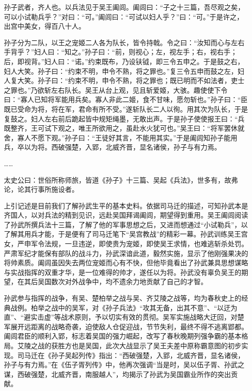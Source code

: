 \documentclass[12pt,UTF8]{ctexbook}
\begin{document}
孙子武者，齐人也。以兵法见于吴王阖闾。阖闾曰：“子之十三篇，吾尽观之矣，可以小试勒兵乎？”对曰：“可。”阖闾曰：“可试以妇人乎？”曰：“可。”于是许之，出宫中美女，得百八十人。

孙子分为二队，以王之宠姬二人各为队长，皆令持戟。令之曰：“汝知而心与左右手背乎？”妇人曰：“知之。”孙子曰：“前，则视心；左，视左手；右，视右手；后，即视背。”妇人曰：“诺。”约束既布，乃设𫓧钺，即三令五申之。于是鼓之右，妇人大笑。孙子曰：“约束不明，申令不熟，将之罪也。”复三令五申而鼓之左，妇人复大笑。孙子曰：“约束不明，申令不熟，将之罪也；既已明而不如法者，吏士之罪也。”乃欲斩左右队长。吴王从台上观，见且斩爱姬，大骇。趣使使下令曰：“寡人已知将军能用兵矣。寡人非此二姬，食不甘味，愿勿斩也。”孙子曰：“臣既已受命为将，将在军，君命有所不受。”遂斩队长二人以徇。用其次为队长，于是复鼓之。妇人左右前后跪起皆中规矩绳墨，无敢出声。于是孙子使使报王曰：“兵既整齐，王可试下观之，唯王所欲用之，虽赴水火犹可也。”吴王曰：“将军罢休就舍，寡人不愿下观。”孙子曰：“王徒好其言，不能用其实。”于是阖闾知孙子能用兵，卒以为将。西破强楚，入郢，北威齐晋，显名诸侯，孙子与有力焉。

……

太史公曰：世俗所称师旅，皆道《孙子》十三篇、吴起《兵法》，世多有，故弗论，论其行事所施设者。

上引记述是目前我们了解孙武生平的基本史料。依据司马迁的描述，可知孙武本是齐国人，以对兵法的精到见识，远赴吴国拜谒阖闾，期望得到重用。吴王阖闾阅读了孙武所撰兵法十三篇，了解了他的军事思想之后，又进而想通过“小试勒兵”，以了解其用兵才能，于是便有了司马迁笔下“吴宫教战”的精彩一幕。孙武训练吴王宫女，严申军令法规，一旦违逆，即使贵为宠姬，即使吴王求情，也难逃斩杀处罚。严肃军纪才能保有部队的战斗力，孙武深谙此道，毅然实施，显示了他刚强果决的将帅素质。阖闾虽因失去两位宠姬而心有不快，但他毕竟看出了孙武兼具思想谋略与实战指挥的双重才华，是一位难得的帅才，遂任以为将。孙武没有辜负吴王的期望，在其后吴国数次对外战争中，均不遗余力地贡献了自己的才智。

孙武参与指挥的战争，有吴、楚柏举之战与吴、齐艾陵之战等，均为春秋史上的经典战例。柏举之战中的吴军，对《孙子兵法》“攻其无备，出其不意”、“以迂为直”、“避实击虚”等战术原则，予以切实有效的贯彻。吴军实施战略大迂回，对楚军展开远距离的战略奇袭，迫使敌人仓促迎战，节节失利，最终不得不逃离郢都。阖闾君臣的顺利入郢，标志着吴国的强力崛起，改写了春秋晚期列强争霸的基本格局。艾陵之战的获胜方也是吴国，此次大战显示了吴王夫差中原称霸意图的初步实现。司马迁在《孙子吴起列传》指出：“西破强楚，入郢，北威齐晋，显名诸侯，孙子与有力焉。”在《伍子胥列传》中，他再次强调“当是时，吴以伍子胥、孙武之谋，西破强楚，北威齐晋，南服越人”，均揭示了孙武为吴国霸业所作的突出贡献。
\end{document}
